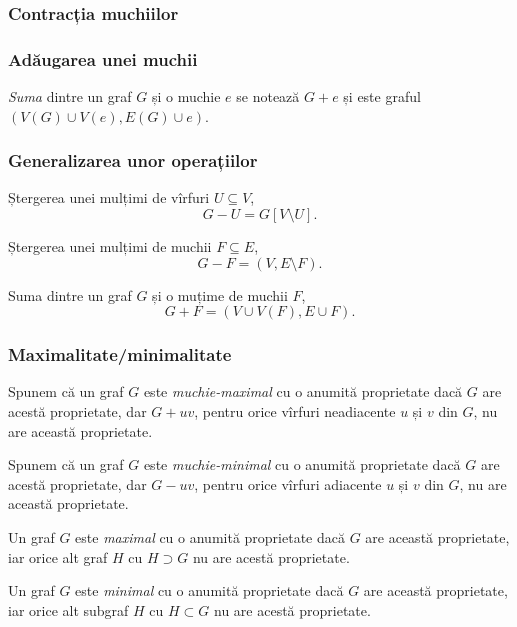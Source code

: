 \begin{frame}
  \frametitle{Contracția muchiilor}

\begin{figure}
\centering%
\end{figure}
  
\end{frame}

\begin{frame}
  \frametitle{Adăugarea unei muchii}

\emph{Suma} dintre un graf $G$ și o muchie $e$ se notează $G+e$ și este graful $(V(G)\cup V(e),E(G)\cup e)$. 

\end{frame}


\begin{frame}
  \frametitle{Generalizarea unor operațiilor}
 
Ștergerea unei mulțimi de vîrfuri $U\subseteq V$,
\[
  G-U=G[V\setminus U].
\]\pause

Ștergerea unei mulțimi de muchii $F\subseteq E$,
\[
  G-F=(V,E\setminus F).
\]\pause

Suma dintre un graf $G$ și o muțime de muchii $F$,
\[
  G+F=(V\cup V(F),E\cup F).
\]


\end{frame}

\begin{frame}
  \frametitle{Maximalitate/minimalitate}

Spunem că un graf $G$ este \emph{muchie-maximal} cu o anumită proprietate dacă $G$ are acestă proprietate, dar $G+uv$, pentru orice vîrfuri neadiacente $u$ și $v$ din $G$, nu are această proprietate.\pause

Spunem că un graf $G$ este \emph{muchie-minimal} cu o anumită proprietate dacă $G$ are acestă proprietate, dar $G-uv$, pentru orice vîrfuri adiacente $u$ și $v$ din $G$, nu are această proprietate.\pause

Un graf $G$ este \emph{maximal} cu o anumită proprietate dacă $G$ are această proprietate, iar orice alt graf $H$ cu $H\supset G$ nu are acestă proprietate.\pause

Un graf $G$ este \emph{minimal} cu o anumită proprietate dacă $G$ are această proprietate, iar orice alt subgraf $H$ cu $H\subset G$ nu are acestă proprietate.

\end{frame}

